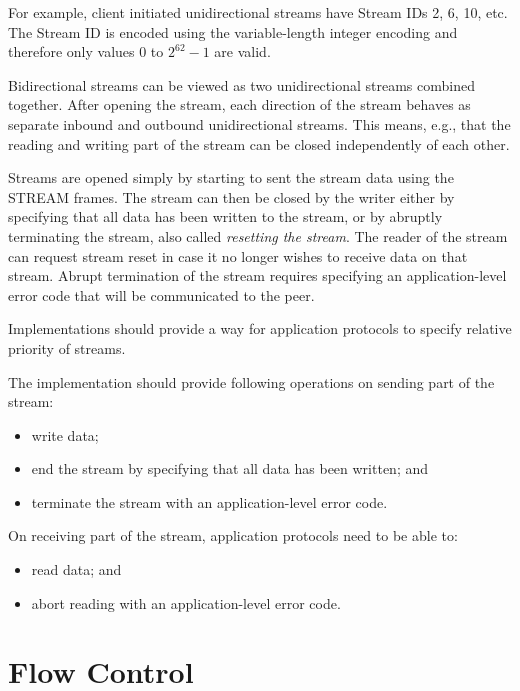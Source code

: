 For example, client initiated unidirectional streams have Stream IDs 2, 6, 10, etc. The Stream ID is
encoded using the variable-length integer encoding and therefore only values 0 to $2^{62}-1$ are
valid.

Bidirectional streams can be viewed as two unidirectional streams combined together. After opening
the stream, each direction of the stream behaves as separate inbound and outbound unidirectional
streams. This means, e.g.\@, that the reading and writing part of the stream can be closed
independently of each other.

Streams are opened simply by starting to sent the stream data using the STREAM frames. The stream
can then be closed by the writer either by specifying that all data has been written to the stream,
or by abruptly terminating the stream, also called \textit{resetting the stream}. The reader of the
stream can request stream reset in case it no longer wishes to receive data on that stream. Abrupt
termination of the stream requires specifying an application-level error code that will be
communicated to the peer.

Implementations should provide a way for application protocols to specify relative priority of
streams.

The implementation should provide following operations on sending part of the stream:

\begin{itemize}

  \item write data;
  \item end the stream by specifying that all data has been written; and
  \item terminate the stream with an application-level error code.

\end{itemize}

On receiving part of the stream, application protocols need to be able to:

\begin{itemize}

  \item read data; and
  \item abort reading with an application-level error code.

\end{itemize}

\section{Flow Control}

